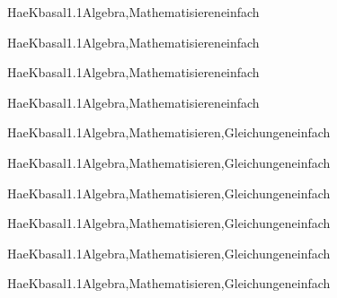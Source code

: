 \documentclass[12pt]{article}
\begin{document}
\begin{Add}{HaeK}{basal1.1}{Algebra,Mathematisieren}{einfach}
\solution{ }
\end{Add}
\begin{Add}{HaeK}{basal1.1}{Algebra,Mathematisieren}{einfach}
\end{Add}

\begin{Add}{HaeK}{basal1.1}{Algebra,Mathematisieren}{einfach}
\solution{ }
\end{Add}
\begin{Add}{HaeK}{basal1.1}{Algebra,Mathematisieren}{einfach}
\end{Add}

\begin{Add}{HaeK}{basal1.1}{Algebra,Mathematisieren,Gleichungen}{einfach}
\solution{ }
\end{Add}
\begin{Add}{HaeK}{basal1.1}{Algebra,Mathematisieren,Gleichungen}{einfach}
\end{Add}

\begin{Add}{HaeK}{basal1.1}{Algebra,Mathematisieren,Gleichungen}{einfach}
\solution{ }
\end{Add}
\begin{Add}{HaeK}{basal1.1}{Algebra,Mathematisieren,Gleichungen}{einfach}
\end{Add}

\begin{Add}{HaeK}{basal1.1}{Algebra,Mathematisieren,Gleichungen}{einfach}
\solution{ }
\end{Add}
\begin{Add}{HaeK}{basal1.1}{Algebra,Mathematisieren,Gleichungen}{einfach}
\end{Add}
\end{document}
